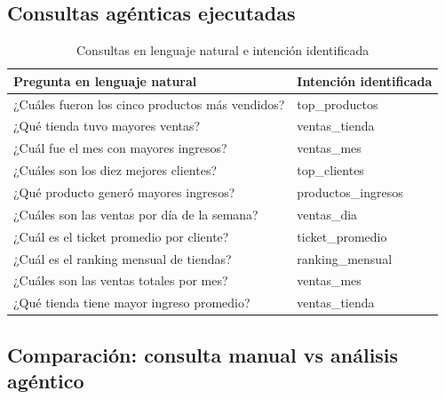 \subsection{Consultas agénticas ejecutadas}

\begin{table}[H]
    \centering
    \caption{Consultas en lenguaje natural e intención identificada}
    \label{tab:agéntico}
    \begin{tabularx}{\textwidth}{X l}
        \toprule
        \textbf{Pregunta en lenguaje natural} & \textbf{Intención identificada} \\
        \midrule
        ¿Cuáles fueron los cinco productos más vendidos?   & top\_productos \\
        ¿Qué tienda tuvo mayores ventas?                   & ventas\_tienda \\
        ¿Cuál fue el mes con mayores ingresos?             & ventas\_mes \\
        ¿Cuáles son los diez mejores clientes?             & top\_clientes \\
        ¿Qué producto generó mayores ingresos?             & productos\_ingresos \\
        ¿Cuáles son las ventas por día de la semana?       & ventas\_dia \\
        ¿Cuál es el ticket promedio por cliente?           & ticket\_promedio \\
        ¿Cuál es el ranking mensual de tiendas?            & ranking\_mensual \\
        ¿Cuáles son las ventas totales por mes?            & ventas\_mes \\
        ¿Qué tienda tiene mayor ingreso promedio?          & ventas\_tienda \\
        \bottomrule
    \end{tabularx}
\end{table}

\subsection{Comparación: consulta manual vs análisis agéntico}

